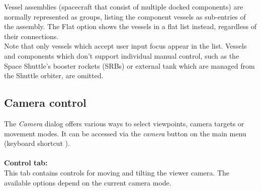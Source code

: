 \documentclass[Orbiter User Manual.tex]{subfiles}
\begin{document}
\noindent
Vessel assemblies (spacecraft that consist of multiple docked components) are normally represented as groups, listing the component vessels as sub-entries of the assembly. The Flat option shows the vessels in a flat list instead, regardless of their connections.\\
Note that only vessels which accept user input focus appear in the list. Vessels and components which don't support individual manual control, such as the Space Shuttle's booster rockets (SRBs) or external tank which are managed from the Shuttle orbiter, are omitted.


\subsection{Camera control}
\label{ssec:menu_camera}
The \textit{Camera} dialog offers various ways to select viewpoints, camera targets or movement modes. It can be accessed via the \textit{camera} button on the main menu (keyboard shortcut \Ctrl{}).\\
\\
\textbf{Control tab:}\\
This tab contains controls for moving and tilting the viewer camera. The available options depend on the current camera mode.

\begin{figure}[H]
	\centering
\end{figure}
\end{document}
